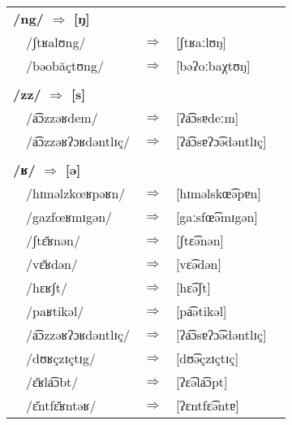 \begin{longtable}[l]{p{0.1mm}lcll}
  \multicolumn{5}{l}{\textbf{/ng/ $\Rightarrow$ [ŋ]}}                                              \\
    & /ʃtʁalʊng/         & $\Rightarrow$ & [ʃtʁaːlʊŋ]          &                                   \\
    & /bəobăçtʊng/       & $\Rightarrow$ & [bəʔoːbaχtʊŋ]       &                                   \\
  \multicolumn{5}{l}{ }                                                                            \\
  \multicolumn{5}{l}{\textbf{/zz/ $\Rightarrow$ [s]}}                                              \\
    & /a͡ɔzzəʁdem/        & $\Rightarrow$ & [ʔa͡ɔsɐdeːm]         &                                   \\
    & /a͡ɔzzəʁʔɔʁdəntlɪç/ & $\Rightarrow$ & [ʔa͡ɔsɐʔɔ͡ədəntlɪç]   &                                   \\
  \multicolumn{5}{l}{ }                                                                            \\
  \multicolumn{5}{l}{\textbf{/ʁ/ $\Rightarrow$ [ə]}}                                               \\
    & /hɪməlzkœʁpəʁn/    & $\Rightarrow$ & [hɪməlskœ͡əpɐn]      &                                   \\
    & /gazfœʁmɪgən/      & $\Rightarrow$ & [gaːsfœ͡əmɪgən]      &                                   \\
    & /ʃtɛ̆ʁnən/          & $\Rightarrow$ & [ʃtɛ͡ənən]           &                                   \\
    & /vɛ̆ʁdən/           & $\Rightarrow$ & [vɛ͡ədən]            &                                   \\
    & /hɛʁʃt/            & $\Rightarrow$ & [hɛ͡əʃt]             &                                   \\
    & /paʁtikəl/         & $\Rightarrow$ & [pa͡ətikəl]          &                                   \\
    & /a͡ɔzzəʁʔɔʁdəntlɪç/ & $\Rightarrow$ & [ʔa͡ɔsɐʔɔ͡ədəntlɪç]   &                                   \\
    & /dʊʁçzɪçtɪg/       & $\Rightarrow$ & [dʊ͡əçzɪçtɪç]        &                                   \\
    & /ɛ̆ʁla͡ɔbt/          & $\Rightarrow$ & [ʔɛ͡əla͡ɔpt]          &                                   \\
    & /ɛ̆ntfɛ̆ʁntəʁ/       & $\Rightarrow$ & [ʔɛntfɛ͡əntɐ]        &                                   \\

\end{longtable}
